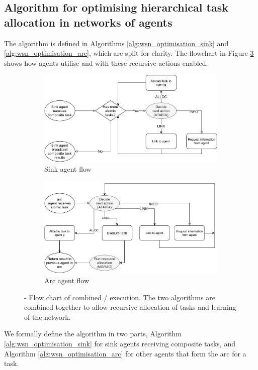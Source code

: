 \newcommand{\functionANHTAO}[2]{
	\functionSignature{\texttt{anhtao-arc}}{\varAtomicTask{}{}, \varAgent{}{}}
}

\subsection{Algorithm for optimising hierarchical task allocation in networks of agents}

The \acronymWSNOptimisationExtended{}{} algorithm is defined in Algorithms \ref{alg:wsn_optimisation_sink}
and \ref{alg:wsn_optimisation_arc}, which are split for clarity. The flowchart in Figure \ref{fig:algorithm-flow} shows how agents utilise \acronymATARIA{}{} and \acronymMGRAO{}{} with these recursive actions enabled. 
\begin{figure}[ht]
	\centering
	\begin{subfigure}{.49\textwidth}
		\centering
		\includegraphics[width=0.9\linewidth, trim={25pt 0pt 25pt 0pt, clip}]{algorithm-flow-sink}
		\caption{Sink agent flow}
		\label{fig:algorithm-flow-sink}
	\end{subfigure} \hfill%
	\begin{subfigure}{.49\textwidth}
		\centering	\includegraphics[width=0.9\linewidth,trim={25pt 0pt 25pt 0pt, clip}]{algorithm-flow-arc}
		\caption{Arc agent flow}
		\label{fig:algorithm-flow-arc}
	\end{subfigure}
	\caption{\textbf{\acronymWSNOptimisation{}{}} - Flow chart of combined \acronymATARIA{}{}/\acronymMGRAO{}{} execution. The two algorithms are combined together to allow recursive allocation of tasks and learning of the network.}
	\label{fig:algorithm-flow}
\end{figure}
We formally define the \acronymWSNOptimisation{}{} algorithm in two parts, Algorithm \ref{alg:wsn_optimisation_sink} for sink agents receiving composite tasks, and Algorithm \ref{alg:wsn_optimisation_arc} for other agents that form the arc for a task.

